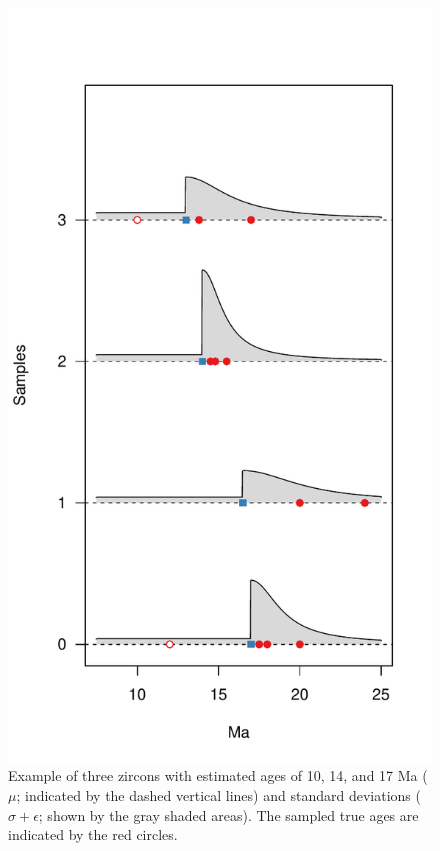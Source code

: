 \documentclass[12pt,letterpaper]{article}
\begin{document}
\begin{figure}[h!]
\centering
\includegraphics[width=120mm]{figs/SampleProb.pdf}
\caption{Example of three zircons with estimated ages of 10, 14, and 17 Ma ($\mu$; indicated by the dashed vertical lines) and standard deviations ($\sigma + \epsilon$; shown by the gray shaded areas). The sampled true ages are indicated by the red circles. }
\label{f_sample_prob}
\end{figure}
\end{document}
